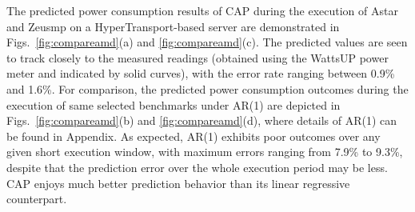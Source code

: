 \documentclass[acmtaco]{acmtrans2m}
\newcommand{\figurenames}{Figs.}
\begin{document}
The predicted power consumption results of CAP during the execution of
Astar and Zeusmp on a HyperTransport-based server are demonstrated in
\figurenames~\ref{fig:compareamd}(a) and \ref{fig:compareamd}(c).  The
predicted values are seen to track closely to the measured readings
(obtained using the WattsUP power meter and indicated by solid curves),
with the error rate ranging between 0.9\% and 1.6\%.  For comparison,
the predicted power consumption outcomes during the execution of same
selected benchmarks under AR(1) are depicted in
\figurenames~\ref{fig:compareamd}(b) and \ref{fig:compareamd}(d), where
details of AR(1) can be found in Appendix.  As expected, AR(1) exhibits
poor outcomes over any given short execution window, with maximum errors
ranging from 7.9\% to 9.3\%, despite that the prediction error over the
whole execution period may be less.  CAP enjoys much better prediction
behavior than its linear regressive counterpart.
\end{document}
